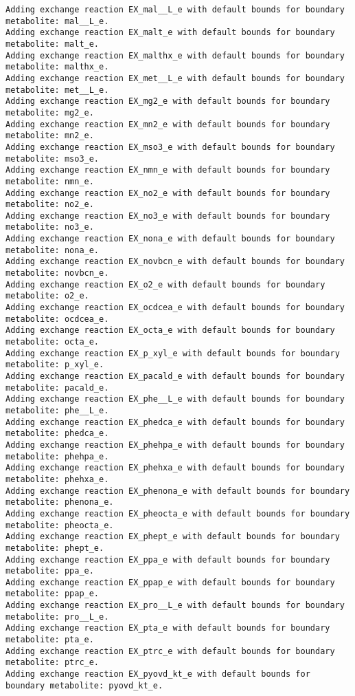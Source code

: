 \documentclass[
  letterpaper,
  DIV=11,
  numbers=noendperiod]{scrartcl}
\begin{document}
\begin{verbatim}
Adding exchange reaction EX_mal__L_e with default bounds for boundary metabolite: mal__L_e.
Adding exchange reaction EX_malt_e with default bounds for boundary metabolite: malt_e.
Adding exchange reaction EX_malthx_e with default bounds for boundary metabolite: malthx_e.
Adding exchange reaction EX_met__L_e with default bounds for boundary metabolite: met__L_e.
Adding exchange reaction EX_mg2_e with default bounds for boundary metabolite: mg2_e.
Adding exchange reaction EX_mn2_e with default bounds for boundary metabolite: mn2_e.
Adding exchange reaction EX_mso3_e with default bounds for boundary metabolite: mso3_e.
Adding exchange reaction EX_nmn_e with default bounds for boundary metabolite: nmn_e.
Adding exchange reaction EX_no2_e with default bounds for boundary metabolite: no2_e.
Adding exchange reaction EX_no3_e with default bounds for boundary metabolite: no3_e.
Adding exchange reaction EX_nona_e with default bounds for boundary metabolite: nona_e.
Adding exchange reaction EX_novbcn_e with default bounds for boundary metabolite: novbcn_e.
Adding exchange reaction EX_o2_e with default bounds for boundary metabolite: o2_e.
Adding exchange reaction EX_ocdcea_e with default bounds for boundary metabolite: ocdcea_e.
Adding exchange reaction EX_octa_e with default bounds for boundary metabolite: octa_e.
Adding exchange reaction EX_p_xyl_e with default bounds for boundary metabolite: p_xyl_e.
Adding exchange reaction EX_pacald_e with default bounds for boundary metabolite: pacald_e.
Adding exchange reaction EX_phe__L_e with default bounds for boundary metabolite: phe__L_e.
Adding exchange reaction EX_phedca_e with default bounds for boundary metabolite: phedca_e.
Adding exchange reaction EX_phehpa_e with default bounds for boundary metabolite: phehpa_e.
Adding exchange reaction EX_phehxa_e with default bounds for boundary metabolite: phehxa_e.
Adding exchange reaction EX_phenona_e with default bounds for boundary metabolite: phenona_e.
Adding exchange reaction EX_pheocta_e with default bounds for boundary metabolite: pheocta_e.
Adding exchange reaction EX_phept_e with default bounds for boundary metabolite: phept_e.
Adding exchange reaction EX_ppa_e with default bounds for boundary metabolite: ppa_e.
Adding exchange reaction EX_ppap_e with default bounds for boundary metabolite: ppap_e.
Adding exchange reaction EX_pro__L_e with default bounds for boundary metabolite: pro__L_e.
Adding exchange reaction EX_pta_e with default bounds for boundary metabolite: pta_e.
Adding exchange reaction EX_ptrc_e with default bounds for boundary metabolite: ptrc_e.
Adding exchange reaction EX_pyovd_kt_e with default bounds for boundary metabolite: pyovd_kt_e.

\end{verbatim}
\end{document}
